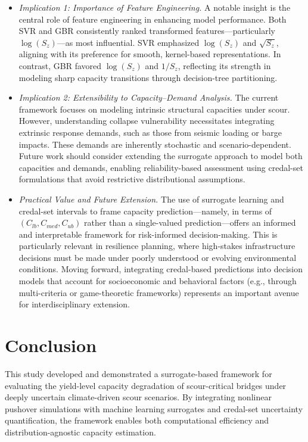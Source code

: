 \documentclass[authoryear,preprint,review,12pt]{elsarticle}
\begin{document}
\begin{itemize}
    \item \textit{Implication 1: Importance of Feature Engineering.} 
    A notable insight is the central role of feature engineering in enhancing model performance. Both SVR and GBR consistently ranked transformed features—particularly $\log(S_z)$—as most influential. SVR emphasized $\log(S_z)$ and $\sqrt{S_z}$, aligning with its preference for smooth, kernel-based representations. In contrast, GBR favored $\log(S_z)$ and $1/S_z$, reflecting its strength in modeling sharp capacity transitions through decision-tree partitioning.

    \item \textit{Implication 2: Extensibility to Capacity–Demand Analysis.} 
    The current framework focuses on modeling intrinsic structural capacities under scour. However, understanding collapse vulnerability necessitates integrating extrinsic response demands, such as those from seismic loading or barge impacts. These demands are inherently stochastic and scenario-dependent. Future work should consider extending the surrogate approach to model both capacities and demands, enabling reliability-based assessment using credal-set formulations that avoid restrictive distributional assumptions.

    \item \textit{Practical Value and Future Extension.} 
    The use of surrogate learning and credal-set intervals to frame capacity prediction—namely, in terms of $(C_{lb}, C_{med}, C_{ub})$ rather than a single-valued prediction—offers an informed and interpretable framework for risk-informed decision-making. This is particularly relevant in resilience planning, where high-stakes infrastructure decisions must be made under poorly understood or evolving environmental conditions. Moving forward, integrating credal-based predictions into decision models that account for socioeconomic and behavioral factors (e.g., through multi-criteria or game-theoretic frameworks) represents an important avenue for interdisciplinary extension.

\end{itemize}

\section{Conclusion}

This study developed and demonstrated a surrogate-based framework for evaluating the yield-level capacity degradation of scour-critical bridges under deeply uncertain climate-driven scour scenarios. By integrating nonlinear pushover simulations with machine learning surrogates and credal-set uncertainty quantification, the framework enables both computational efficiency and distribution-agnostic capacity estimation.
\end{document}
